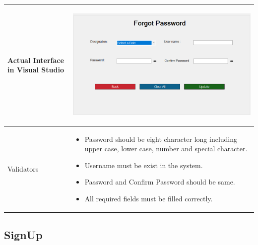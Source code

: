 \documentclass[12pt,a4paper]{article}
\begin{document}
\begin{longtable}{| p{3cm}|p{12cm}|}
Actual Interface in Visual Studio  & \begin{center} \includegraphics[scale=0.3]{./User Interface1/UI-003 Forgot password@1x.png}\end{center}  \\ \hline


Validators & 
\begin{itemize}
\item  Password should be eight character long including upper case, lower case, number and special character.
\item  Username must be exist in the system.
\item  Password and Confirm Password should be same.
\item All required fields must be filled correctly. 
\end{itemize}
\\ \hline

\end{longtable}
\subsection{SignUp}
\end{document}
